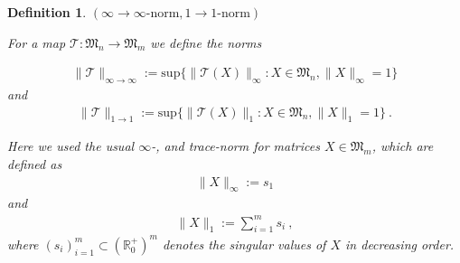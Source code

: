 \documentclass[a4paper
               ,12pt
               ,DIV=12
               ,oneside
               ]
               {amsart}
\theoremstyle{plain}
\newtheorem{cor}{Corollary}
\newtheorem{defn}{Definition}
\theoremstyle{remark}
\def\ra{\rightarrow}
\def\lb{\left(}
\def\rb{\right)}
\def\lset{\lbrace}
\def\rset{\rbrace}
\def\lk{\left\langle}
\def\rk{\right\rangle}
\def\l|{\left|}
\def\r|{\right|}
\newcommand\C{\mathbb{C}}
\newcommand\R{\mathbb{R}}
\newcommand\M{\mathfrak{M}}
\newcommand{\Tm}{\mathcal{T}}
\newcommand{\Xst}{X}
\begin{document}
% 
%
%
%
%
%
%

\begin{defn}$\lb\infty\ra\infty\text{-norm},1\ra 1\text{-norm}\rb$

For a map $\Tm :\M_n\ra \M_m$ we define the norms 

\begin{align*}
\| \Tm\|_{\infty\ra\infty} := \text{sup}\lset \| \Tm\lb\Xst\rb\|_{\infty}:\Xst\in\M_n,\|\Xst\|_\infty = 1\rset
\end{align*}
and
\begin{align*}
\| \Tm\|_{1\ra 1} := \text{sup}\lset \| \Tm\lb\Xst\rb\|_{1}:\Xst\in\M_n,\|\Xst\|_1 = 1\rset\medspace.
\end{align*}

Here we used the usual $\infty$-, and trace-norm for matrices $\Xst\in\M_m$, which are defined as
\begin{align*}
\| \Xst\|_{\infty} := s_1
\end{align*}
and
\begin{align*}
\| \Xst\|_{1} := \sum^{m}_{i=1} s_i\medspace,
\end{align*}
where $\lb s_i\rb^m_{i=1}\subset\lb\R_0^+\rb^m$ denotes the singular values of $\Xst$ in decreasing order.

\end{defn}
\end{document}
